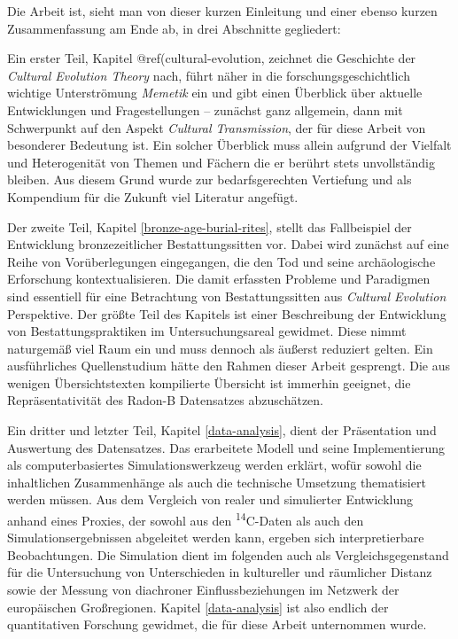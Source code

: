 \documentclass[openany,twoside,twocolumn]{book}
\begin{document}
Die Arbeit ist, sieht man von dieser kurzen Einleitung und einer ebenso
kurzen Zusammenfassung am Ende ab, in drei Abschnitte gegliedert:

Ein erster Teil, Kapitel @ref(cultural-evolution, zeichnet die
Geschichte der \emph{Cultural Evolution Theory} nach, führt näher in die
forschungsgeschichtlich wichtige Unterströmung \emph{Memetik} ein und
gibt einen Überblick über aktuelle Entwicklungen und Fragestellungen --
zunächst ganz allgemein, dann mit Schwerpunkt auf den Aspekt
\emph{Cultural Transmission}, der für diese Arbeit von besonderer
Bedeutung ist. Ein solcher Überblick muss allein aufgrund der Vielfalt
und Heterogenität von Themen und Fächern die er berührt stets
unvollständig bleiben. Aus diesem Grund wurde zur bedarfsgerechten
Vertiefung und als Kompendium für die Zukunft viel Literatur angefügt.

Der zweite Teil, Kapitel \ref{bronze-age-burial-rites}, stellt das
Fallbeispiel der Entwicklung bronzezeitlicher Bestattungssitten vor.
Dabei wird zunächst auf eine Reihe von Vorüberlegungen eingegangen, die
den Tod und seine archäologische Erforschung kontextualisieren. Die
damit erfassten Probleme und Paradigmen sind essentiell für eine
Betrachtung von Bestattungssitten aus \emph{Cultural Evolution}
Perspektive. Der größte Teil des Kapitels ist einer Beschreibung der
Entwicklung von Bestattungspraktiken im Untersuchungsareal gewidmet.
Diese nimmt naturgemäß viel Raum ein und muss dennoch als äußerst
reduziert gelten. Ein ausführliches Quellenstudium hätte den Rahmen
dieser Arbeit gesprengt. Die aus wenigen Übersichtstexten kompilierte
Übersicht ist immerhin geeignet, die Repräsentativität des Radon-B
Datensatzes abzuschätzen.

Ein dritter und letzter Teil, Kapitel \ref{data-analysis}, dient der
Präsentation und Auswertung des Datensatzes. Das erarbeitete Modell und
seine Implementierung als computerbasiertes Simulationswerkzeug werden
erklärt, wofür sowohl die inhaltlichen Zusammenhänge als auch die
technische Umsetzung thematisiert werden müssen. Aus dem Vergleich von
realer und simulierter Entwicklung anhand eines Proxies, der sowohl aus
den \textsuperscript{14}C-Daten als auch den Simulationsergebnissen
abgeleitet werden kann, ergeben sich interpretierbare Beobachtungen. Die
Simulation dient im folgenden auch als Vergleichsgegenstand für die
Untersuchung von Unterschieden in kultureller und räumlicher Distanz
sowie der Messung von diachroner Einflussbeziehungen im Netzwerk der
europäischen Großregionen. Kapitel \ref{data-analysis} ist also endlich
der quantitativen Forschung gewidmet, die für diese Arbeit unternommen
wurde.
\end{document}
